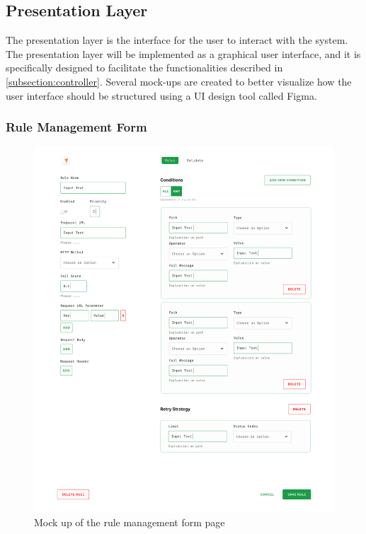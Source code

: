\newpage
\subsection{Presentation Layer}
  \label{sub:design_view}

The presentation layer is the interface for the user to interact with the system. The presentation layer will be implemented as a graphical user interface, and it is specifically designed to facilitate the functionalities described in \autoref{subsection:controller}. Several mock-ups are created to better visualize how the user interface should be structured using a UI design tool called Figma.  

\subsubsection{Rule Management Form}

\begin{figure}[!h]
  \includegraphics[width=\textwidth]{diagrams/mockup_rule_management.png}
  \caption{Mock up of the rule management form page}
\end{figure}

